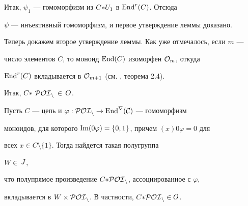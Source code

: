 \begin{pf}
Итак, $\psi_1$ --- гомоморфизм из $C{*} U_1$ в $\operatorname{End}^r(C)$. Отсюда


$\psi$ --- инъективный гомоморфизм, и первое утверждение леммы доказано.





Теперь докажем второе утверждение леммы. Как уже отмечалось, если $m$ ---


число элементов $C$, то моноид $\operatorname{End}(C)$ изоморфен ${\cal O}_m$, откуда


$\operatorname{End}^r(C)$ вкладывается в ${\cal O}_{m+1}$ (см. \cite{HIG1}, теорема 2.4).


Итак, $C{*}$\,$ \cal{POI}_n$\,$\in$\,$\boldmath{O}$.


\end{pf}





\begin{lems} \label{odiv5}


Пусть $C$ --- цепь и $\varphi:\cal{POI}_n\rightarrow\operatorname{End}^r(C)$ --- гомоморфизм


моноидов, для которого $\operatorname{Im}(0\varphi)=\{0,1\}$, причем $(x)0\varphi=0$ для


всех $x\in C\setminus\{1\}$. Тогда найдется такая полугруппа


$W\in$\,$\boldmath{J}$,


что полупрямое произведение $C{*} \cal{POI}_n$, ассоциированное с $\varphi$,


вкладывается в $W\times\cal{POI}_n$. В частности, $C{*} \cal{POI}_n\in$\,$\boldmath{O}$.


\end{lems}






